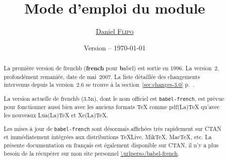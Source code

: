\documentclass[a4paper,12pt,german,english,french]{article}
\title{Mode d’emploi du module \ext{babel-french}}
\author{\href{mailto:daniel.flipo@free.fr}{Daniel \textsc{Flipo}}}
\date{Version {\latestversion} -- \today}
\def\ColorVerb{\color{MidnightBlue}}
\newcommand*{\ext}[1]{\texttt{\ColorVerb #1}}
\newcommand*{\latestversion}{3.5n}
\begin{document}
\def\today{18 avril 2022}

\maketitle
\thispagestyle{empty}

\begin{abstract}
  La première version de frenchb (\textbf{french} pour \textbf{b}abel) est
  sortie en 1996.  La version~2, profondément remaniée, date de mai~2007.
  La liste détaillée des changements intervenus depuis la version~2.6 se
  trouve à la section~\ref{sec:changes-3.0} p.~\pageref{sec:changes-3.0}.

  La version actuelle de frenchb (\latestversion), dont le nom officiel est
  \ext{babel-french}, est prévue pour fonctionner aussi bien avec les anciens
  formats TeX comme pdf(La)TeX qu’avec les nouveaux Lua(La)TeX et Xe(La)TeX.

  Les mises à jour de \ext{babel-french} sont désormais affichées très
  rapidement sur CTAN et immédiatement intégrées aux distributions TeXLive,
  MikTeX, MacTeX, etc.
  La présente documentation en français est également disponible sur CTAN,
  il n’y a plus besoin de la récupérer sur mon site
  personnel {\expandafter\expandafter\expandafter\url{\urlperso/babel-french}}.
\end{abstract}
\end{document}
